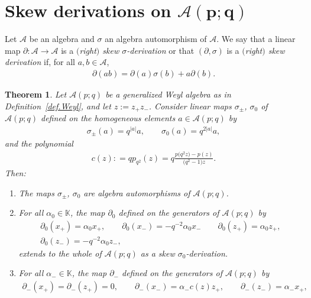 \documentclass[10pt,a4paper]{amsart}
\numberwithin{equation}{section}
\newtheorem{Theorem}{Theorem}[section]
\def\AWeyl#1#2{{\mathcal{A}}(#1;#2)}
\begin{document}
\section[Skew derivations on ${\mathcal A}(p;q)$]{Skew derivations on $\boldsymbol{\AWeyl p q}$}\label{sec.skew}
Let ${\mathcal{A}}$ be an algebra and $\sigma$ an algebra automorphism of ${\mathcal{A}}$. We say that a linear map $\partial\colon {\mathcal{A}} \to {\mathcal{A}}$ is a {\em $($right$)$ skew $\sigma$-derivation} or that $(\partial, \sigma)$ is a {\em $($right$)$ skew derivation} if, for all $a,b\in {\mathcal{A}}$,
\begin{gather*}%
\partial(ab) = \partial(a) \sigma(b) + a\partial(b).
\end{gather*}

\begin{Theorem}\label{thm.skew}
Let $\AWeyl p q$ be a generalized Weyl algebra as in Definition~{\rm \ref{def.Weyl}}, and let $z:= z_+z_-$. Consider linear maps $\sigma_\pm$, $\sigma_0$ of $\AWeyl p q$ defined on the homogeneous elements $a\in \AWeyl p q$ by
\begin{gather}\label{sigma}
\sigma_\pm(a) = q^{|a|}a, \qquad \sigma_0(a) = q^{2|a|}a,
\end{gather}
and the polynomial
\begin{gather}\label{c}
c(z) : = q p _{q^2}(z) = q\frac{p\big(q^2z\big) -p(z)}{\big(q^2 -1\big)z}.
\end{gather}
Then:
\begin{enumerate}\itemsep=0pt
\item[$(1)$] The maps $\sigma_\pm$, $\sigma_0$ are algebra automorphisms of
$\AWeyl p q$.
\item[$(2)$] For all $\alpha_0 \in {\mathbb K}$, the map $\partial_0$ defined on the generators of $\AWeyl p q$ by
\begin{gather*}%
\partial_0(x_+) = \alpha_0 x_+, \qquad \partial_0(x_-) = -q^{-2}\alpha_0 x_-\qquad \partial_0(z_+) = \alpha_0 z_+, \\ \partial_0(z_-) = -q^{-2}\alpha_0 z_-,
\end{gather*}
extends to the whole of $\AWeyl p q$ as a skew $\sigma_0$-derivation.
\item[$(3)$] For all $\alpha_- \in {\mathbb K}$, the map $\partial_-$ defined on the generators of $\AWeyl p q$ by
\begin{gather*}%
\partial_-(x_+)=\partial_-(z_+) = 0, \qquad \partial_-(x_-) = \alpha_- c(z) z_+,\qquad \partial_-(z_-) = \alpha_- x_+,
\end{gather*}

\end{enumerate}
\end{Theorem}
\end{document}
